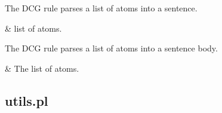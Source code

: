 \label{sec:sentence}

\begin{description}
The  DCG rule parses a list of atoms into a sentence.

\begin{arguments}
 & list of atoms. \\
\end{arguments}

The  DCG rule parses a list of atoms into a sentence body.

\begin{arguments}
 & The list of atoms. \\
\end{arguments}
\end{description}

\subsection{utils.pl}

\label{sec:utils}

